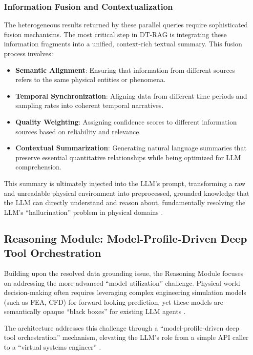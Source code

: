 \subsubsection{Information Fusion and Contextualization}

The heterogeneous results returned by these parallel queries require sophisticated fusion mechanisms. The most critical step in DT-RAG is integrating these information fragments into a unified, context-rich textual summary. This fusion process involves:

\begin{itemize}
\item \textbf{Semantic Alignment}: Ensuring that information from different sources refers to the same physical entities or phenomena.
\item \textbf{Temporal Synchronization}: Aligning data from different time periods and sampling rates into coherent temporal narratives.
\item \textbf{Quality Weighting}: Assigning confidence scores to different information sources based on reliability and relevance.
\item \textbf{Contextual Summarization}: Generating natural language summaries that preserve essential quantitative relationships while being optimized for LLM comprehension.
\end{itemize}

This summary is ultimately injected into the LLM's prompt, transforming a raw and unreadable physical environment into preprocessed, grounded knowledge that the LLM can directly understand and reason about, fundamentally resolving the LLM's ``hallucination'' problem in physical domains \cite{ji2023survey}.

\subsection{Reasoning Module: Model-Profile-Driven Deep Tool Orchestration}

Building upon the resolved data grounding issue, the Reasoning Module focuses on addressing the more advanced ``model utilization'' challenge. Physical world decision-making often requires leveraging complex engineering simulation models (such as FEA, CFD) for forward-looking prediction, yet these models are semantically opaque ``black boxes'' for existing LLM agents \cite{hughes2012finite}.

The architecture addresses this challenge through a ``model-profile-driven deep tool orchestration'' mechanism, elevating the LLM's role from a simple API caller to a ``virtual systems engineer'' \cite{lu2022unified}.

